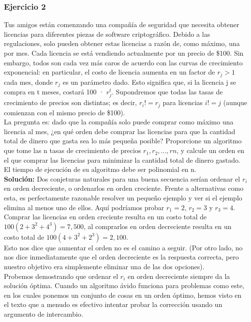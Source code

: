 \documentclass[a4paper, 12pt]{book}
\begin{document}
\subsubsection{Ejercicio 2}

Tus amigos están comenzando una compañía de seguridad que necesita obtener licencias para diferentes piezas de software criptográfico. Debido a las regulaciones, solo pueden obtener estas licencias a razón de, como máximo, una por mes. Cada licencia se está vendiendo actualmente por un precio de \$100. Sin embargo, todos son cada vez más caros de acuerdo con las curvas de crecimiento exponencial: en particular, el costo de licencia aumenta en un factor de $r_j>1$ cada mes, donde $r_j$ es un parámetro dado. Esto significa que, si la licencia j se compra en t meses, costará 100 · $r^t_j$. Supondremos que todas las tasas de crecimiento de precios son distintas; es decir, $r_i != r_j$ para licencias $i != j$ (aunque comienzan con el mismo precio de \$100).\\

La pregunta es: dado que la compañía solo puede comprar como máximo una licencia al mes, ¿en qué orden debe comprar las licencias para que la cantidad total de dinero que gasta sea lo más pequeña posible? Proporcione un algoritmo que tome las n tasas de crecimiento de precios $r_1,r_2,...,rn$, y calcule un orden en el que comprar las licencias para minimizar la cantidad total de dinero gastado. El tiempo de ejecución de su algoritmo debe ser polinomial en n.\\

\textbf{Solución:} Dos conjeturas naturales para una buena secuencia serían ordenar el $r_i$ en orden decreciente, o ordenarlos en orden creciente. Frente a alternativas como esta, es perfectamente razonable resolver un pequeño ejemplo y ver si el ejemplo elimina al menos uno de ellos. Aquí podríamos probar $r_1=2$, $r_2=3$ y $r_3=4$. Comprar las licencias en orden creciente resulta en un costo total de $100(2+3^2+4^3) =7,500$, al comprarlos en orden decreciente resulta en un costo total de $100(4+3^2+2^3)=2,100$.\\

Esto nos dice que aumentar el orden no es el camino a seguir. (Por otro lado, no nos dice inmediatamente que el orden decreciente es la respuesta correcta, pero nuestro objetivo era simplemente eliminar una de las dos opciones).\\

 Probemos demostrando que ordenar el $r_i$ en orden decreciente siempre da la solución óptima. Cuando un algoritmo ávido funciona para problemas como este, en los cuales ponemos un conjunto de cosas en un orden óptimo, hemos visto en el texto que a menudo es efectivo intentar probar la corrección usando un argumento de intercambio.\\
 
\end{document}
